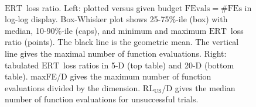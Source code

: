 \documentclass{article}
\newcommand{\bbobdatapath}{ppdata/} %
\newcommand{\ERT}{\ensuremath{\mathrm{ERT}}}
\newcommand{\FEvals}{\ensuremath{\mathrm{FEvals}}}
\newcommand{\nbFEs}{\ensuremath{\mathrm{\#FEs}}}
\begin{document}
\begin{figure}[htbp!]
\subfloat{
\centering
\scriptsize
}\\[-2ex]
\subfloat{
\centering
\scriptsize
}
\caption{\label{fig:ERTloglossa\algfolder}
\ERT\ loss ratio. Left: plotted versus given budget
$\FEvals=\nbFEs$ in log-log display. Box-Whisker plot shows 25-75\%-ile (box)
with median, 10-90\%-ile (caps), and minimum and maximum \ERT\ loss ratio
(points). The black line is the geometric mean. The vertical line gives the
maximal number of function evaluations. Right: tabulated \ERT\ loss ratios
in 5-D (top table) and 20-D (bottom table). maxFE/D gives the maximum number of
function evaluations divided by the dimension. RL$_{\text{US}}$/D gives the
median number of function evaluations for unsuccessful trials.}
\end{figure}
\end{document}
